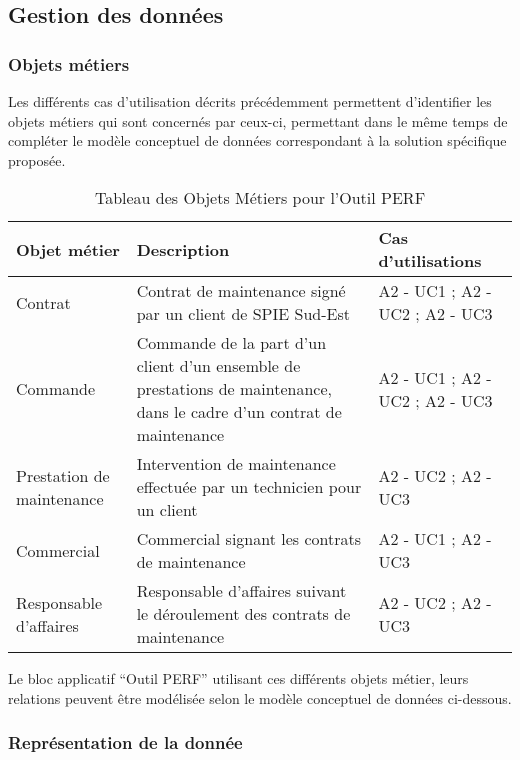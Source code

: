 
\subsection{Gestion des données}

\subsubsection{Objets métiers}

Les différents cas d’utilisation décrits précédemment permettent d’identifier les objets métiers qui sont concernés par ceux-ci, permettant dans le même temps de compléter le modèle conceptuel de données correspondant à la solution spécifique proposée.

\begin{table}[H]
    \begin{tabular}{p{3cm}|p{10cm}|p{3cm}}
    Objet métier & Description & Cas d'utilisations \\ \hline
    Contrat & Contrat de maintenance signé par un client de SPIE Sud-Est & A2 - UC1 ; A2 - UC2 ; A2 - UC3 \\ \hline
    Commande & Commande de la part d’un client d’un ensemble de prestations de maintenance, dans le cadre d’un contrat de maintenance & A2 - UC1 ; A2 - UC2 ; A2 - UC3 \\ \hline
    Prestation de maintenance & Intervention de maintenance effectuée par un technicien pour un client
 & A2 - UC2 ; A2 - UC3 \\ \hline
    Commercial & Commercial signant les contrats de maintenance & A2 - UC1 ; A2 - UC3 \\ \hline
    Responsable d’affaires & Responsable d’affaires suivant le déroulement des contrats de maintenance & A2 - UC2 ; A2 - UC3 \\ 
    \end{tabular}
    \caption{Tableau des Objets Métiers pour l'Outil PERF}
\end{table}

Le bloc applicatif “Outil PERF” utilisant ces différents objets métier, leurs relations peuvent être modélisée selon le modèle conceptuel de données ci-dessous.


\subsubsection{Représentation de la donnée}

